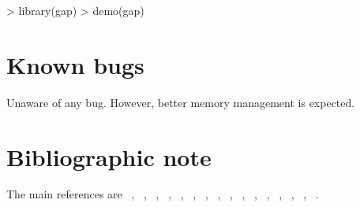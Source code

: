 \documentclass[11pt,a4paper]{article}
\begin{document}
\begin{Schunk}
\begin{Sinput}
> library(gap)
> demo(gap)
\end{Sinput}
\end{Schunk}

\section{Known bugs}

Unaware of any bug. However, better memory management is expected.

\section{Bibliographic note}

The main references are ~\cite{chow60}, ~\cite{guo92}, ~\cite{gholamic94},
~\cite{risch96}, ~\cite{spielman96}, ~\cite{risch97}, ~\cite{miller97}, ~\cite{sham97}, 
~\cite{sham98}, ~\cite{devlin99}, ~\cite{zhao99}, ~\cite{guo00}, 
~\cite{hirotsu01}, ~\cite{zhao02}, ~\cite{zaykin02}, ~\cite{zhao04}.


\end{document}
